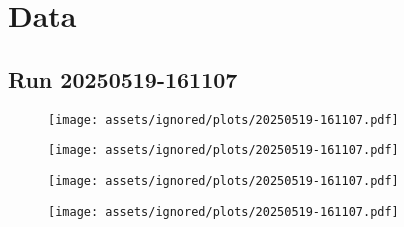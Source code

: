 \chapter{Data}

\section{Run 20250519-161107}

\begin{figure}[h!]
    \centering
    \texttt{[image: assets/ignored/plots/20250519-161107.pdf]}
    \label{fig:runs:20250519-161107}
\end{figure}

\begin{figure}[h!]
    \centering
    \texttt{[image: assets/ignored/plots/20250519-161107.pdf]}
    \label{fig:runs:20250519-161107}
\end{figure}

\begin{figure}[h!]
    \centering
    \texttt{[image: assets/ignored/plots/20250519-161107.pdf]}
    \label{fig:runs:20250519-161107}
\end{figure}

\begin{figure}[h!]
    \centering
    \texttt{[image: assets/ignored/plots/20250519-161107.pdf]}
    \label{fig:runs:20250519-161107}
\end{figure}




